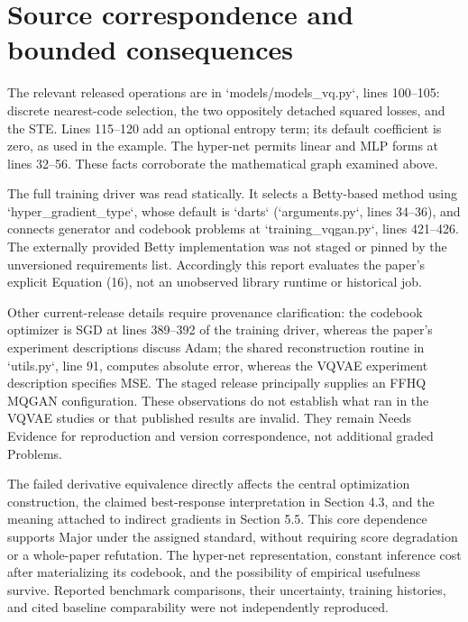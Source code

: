 \documentclass[10pt]{article}
\begin{document}
\section*{Source correspondence and bounded consequences}
The relevant released operations are in `models/models\_vq.py`, lines 100–105: discrete nearest-code selection, the two oppositely detached squared losses, and the STE. Lines 115–120 add an optional entropy term; its default coefficient is zero, as used in the example. The hyper-net permits linear and MLP forms at lines 32–56. These facts corroborate the mathematical graph examined above.\par
The full training driver was read statically. It selects a Betty-based method using `hyper\_gradient\_type`, whose default is `darts` (`arguments.py`, lines 34–36), and connects generator and codebook problems at `training\_vqgan.py`, lines 421–426. The externally provided Betty implementation was not staged or pinned by the unversioned requirements list. Accordingly this report evaluates the paper’s explicit Equation (16), not an unobserved library runtime or historical job.\par
Other current-release details require provenance clarification: the codebook optimizer is SGD at lines 389–392 of the training driver, whereas the paper’s experiment descriptions discuss Adam; the shared reconstruction routine in `utils.py`, line 91, computes absolute error, whereas the VQVAE experiment description specifies MSE. The staged release principally supplies an FFHQ MQGAN configuration. These observations do not establish what ran in the VQVAE studies or that published results are invalid. They remain Needs Evidence for reproduction and version correspondence, not additional graded Problems.\par
The failed derivative equivalence directly affects the central optimization construction, the claimed best-response interpretation in Section 4.3, and the meaning attached to indirect gradients in Section 5.5. This core dependence supports Major under the assigned standard, without requiring score degradation or a whole-paper refutation. The hyper-net representation, constant inference cost after materializing its codebook, and the possibility of empirical usefulness survive. Reported benchmark comparisons, their uncertainty, training histories, and cited baseline comparability were not independently reproduced.\par
\end{document}
